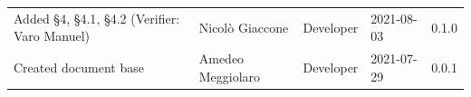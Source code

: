 \documentclass[a4paper]{article}
\begin{document}
\begin{center}
\begin{table}[h!]
\begin{tabular}{p{150px} p{90px} p{80px} p{60px} p{45px}}
            Added \S{4}, \S{4.1}, \S{4.2}  \newline(Verifier: Varo Manuel)                                                                                       & Nicolò Giaccone   & Developer     & 2021-08-03    & 0.1.0            \\
            Created document base                                                                                                                                & Amedeo Meggiolaro & Developer     & 2021-07-29    & 0.0.1            \\
        \end{tabular}
    \end{table}
\end{center}

\newpage
\tableofcontents
\newpage
\newpage
\listoffigures
\newpage






\end{document}
